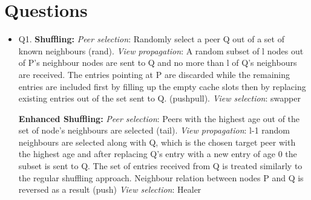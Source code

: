 \documentclass[10pt]{proc}
\begin{document}
\section{Questions}

\begin{itemize}
 \item Q1. 
\textbf{Shuffling:}
\emph{Peer selection}: Randomly select a peer Q out of a set of known neighbours (rand).
\emph{View propagation}: A random subset of l nodes out of P's neighbour nodes are sent to Q and no more than l of Q's neighbours are received. The entries pointing at P are discarded while the remaining entries are included first by filling up the empty cache slots then by replacing existing entries out of the set sent to Q. (pushpull).
\emph{View selection}: swapper

\textbf{Enhanced Shuffling:}
\emph{Peer selection}: Peers with the highest age out of the set of node's neighbours are selected (tail).
\emph{View propagation}: l-1 random neighbours are selected along with Q, which is the chosen target peer with the highest age and after replacing Q's entry with a new entry of age 0 the subset is sent to Q. The set of entries received from Q is treated similarly to the regular shuffling approach. Neighbour relation between nodes P and Q is reversed as a result (push)
\emph{View selection}: Healer


\end{itemize}
\end{document}

